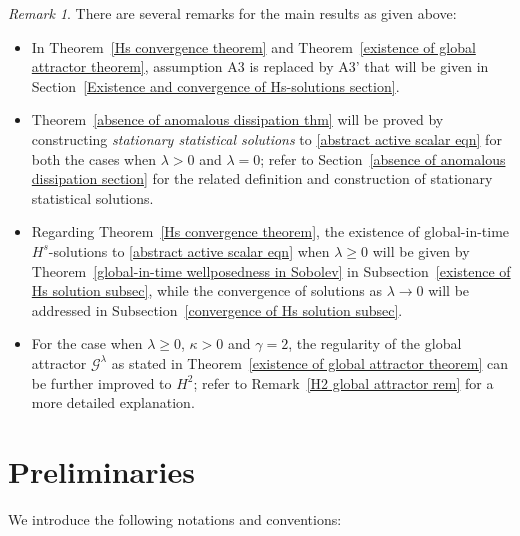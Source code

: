 \documentclass[reqno]{amsart}%
\theoremstyle{definition}
\theoremstyle{remark}
\numberwithin{equation}{section}
\newtheorem{remark}[theorem]{Remark}
\newcommand{\1}{\mathbf{1}}
\newcommand{\Gg}{\mathcal{G}^{\lambda}}
\numberwithin{equation}{section}
\numberwithin{theorem}{section}
\numberwithin{figure}{section}
\begin{document}
\begin{remark}
There are several remarks for the main results as given above:
\begin{itemize} 
\item In Theorem~\ref{Hs convergence theorem} and Theorem~\ref{existence of global attractor theorem}, assumption A3 is replaced by A3' that will be given in Section~\ref{Existence and convergence of Hs-solutions section}.
\item Theorem~\ref{absence of anomalous dissipation thm} will be proved by constructing {\it stationary statistical solutions} to \eqref{abstract active scalar eqn} for both the cases when $\lambda>0$ and $\lambda=0$; refer to Section~\ref{absence of anomalous dissipation section} for the related definition and construction of stationary statistical solutions.
\item Regarding Theorem~\ref{Hs convergence theorem}, the existence of global-in-time $H^s$-solutions to \eqref{abstract active scalar eqn} when $\lambda\ge0$ will be given by Theorem~\ref{global-in-time wellposedness in Sobolev} in Subsection~\ref{existence of Hs solution subsec}, while the convergence of solutions as $\lambda\to0$ will be addressed in Subsection~\ref{convergence of Hs solution subsec}.
\item For the case when $\lambda\ge0$, $\kappa>0$ and $\gamma=2$, the regularity of the global attractor $\Gg$ as stated in Theorem~\ref{existence of global attractor theorem} can be further improved to $H^2$; refer to Remark~\ref{H2 global attractor rem} for a more detailed explanation. 
\end{itemize}
\end{remark}

\section{Preliminaries}\label{preliminaries}

We introduce the following notations and conventions:
\end{document}
